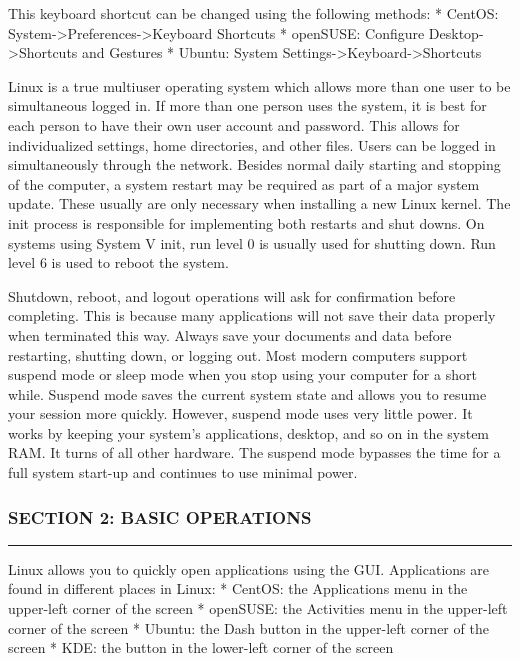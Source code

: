 This keyboard shortcut can be changed using the following methods: *
CentOS: System-\textgreater{}Preferences-\textgreater{}Keyboard
Shortcuts * openSUSE: Configure Desktop-\textgreater{}Shortcuts and
Gestures * Ubuntu: System
Settings-\textgreater{}Keyboard-\textgreater{}Shortcuts

Linux is a true multiuser operating system which allows more than one
user to be simultaneous logged in. If more than one person uses the
system, it is best for each person to have their own user account and
password. This allows for individualized settings, home directories, and
other files. Users can be logged in simultaneously through the network.
Besides normal daily starting and stopping of the computer, a system
restart may be required as part of a major system update. These usually
are only necessary when installing a new Linux kernel. The init process
is responsible for implementing both restarts and shut downs. On systems
using System V init, run level 0 is usually used for shutting down. Run
level 6 is used to reboot the system.

Shutdown, reboot, and logout operations will ask for confirmation before
completing. This is because many applications will not save their data
properly when terminated this way. Always save your documents and data
before restarting, shutting down, or logging out. Most modern computers
support suspend mode or sleep mode when you stop using your computer for
a short while. Suspend mode saves the current system state and allows
you to resume your session more quickly. However, suspend mode uses very
little power. It works by keeping your system's applications, desktop,
and so on in the system RAM. It turns of all other hardware. The suspend
mode bypasses the time for a full system start-up and continues to use
minimal power.

\subsubsection{SECTION 2: BASIC
OPERATIONS}\label{section-2-basic-operations}

\begin{center}\rule{3in}{0.4pt}\end{center}

Linux allows you to quickly open applications using the GUI.
Applications are found in different places in Linux: * CentOS: the
Applications menu in the upper-left corner of the screen * openSUSE: the
Activities menu in the upper-left corner of the screen * Ubuntu: the
Dash button in the upper-left corner of the screen * KDE: the button in
the lower-left corner of the screen


